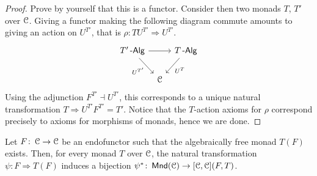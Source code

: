 \documentclass[a4paper,11pt,oneside,openany]{scrbook}
\begin{document}
\begin{proof}
    Prove by yourself that this is a functor. Consider then two monads $T$, $T'$ over $\operatorname{\mathcal{C}}$. Giving a functor making the following diagram commute amounts to giving an action on $U^{T'}$, that is $\rho\colon TU^{T'}\Rightarrow U^{T'}$.
    \[
    \begin{tikzcd}[column sep=tiny]
        T'\Alg\ar[rr]\ar[dr, swap, "U^{T'}"]
        && T\Alg\ar[dl, "U^T"] \\
        & \C
    \end{tikzcd}
    \]
    Using the adjunction $F^{T'}\dashv U^{T'}$, this corresponds to a unique natural transformation $T\Rightarrow U^{T'}F^{T'}=T'$. Notice that the $T$-action axioms for $\rho$ correspond precisely to axioms for morphisms of monads, hence we are done.
\end{proof}

\begin{prop}
    Let $F\colon\operatorname{\mathcal{C}}\rightarrow\operatorname{\mathcal{C}}$ be an endofunctor such that the algebraically free monad $T(F)$ exists. Then, for every monad $T$ over $\operatorname{\mathcal{C}}$, the natural transformation $\psi\colon F\Rightarrow T(F)$ induces a bijection $\psi^*\colon\operatorname{\mathsf{Mnd}}(\operatorname{\mathcal{C}})\rightarrow [\operatorname{\mathcal{C}},\operatorname{\mathcal{C}}](F,T)$.
\end{prop}
\end{document}
